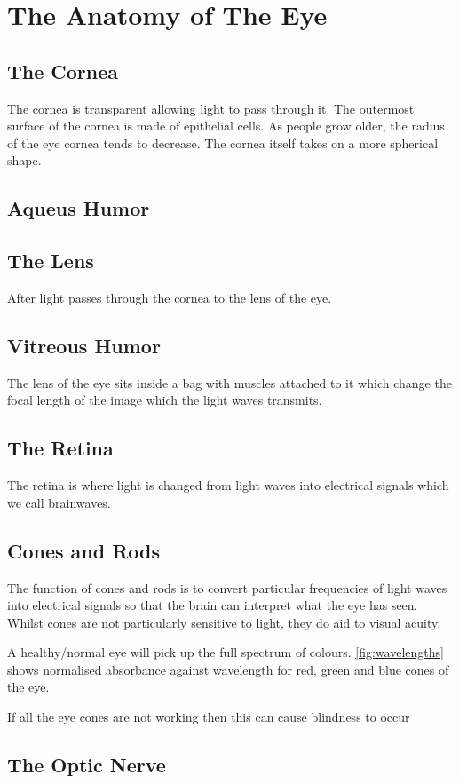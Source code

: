 
 \chapter{The Anatomy of The Eye}

\label{anatomy} %


\section{The Cornea}

The cornea is transparent allowing light to pass through it.
The outermost surface of the cornea is made of epithelial cells.
\cite{hassell2010molecular}
\cite{jester1999cellular,hassell2010molecular} As people grow older, the radius
of the eye cornea tends to decrease. The cornea itself takes on a more
spherical shape.\cite{guirao2000optical}

\section{Aqueus Humor}

\section{The Lens}
After light passes through the cornea to the lens of the eye.

\section{Vitreous Humor}

The lens of the eye sits inside a bag with muscles attached to it which change
the focal length of the image which the light waves transmits.

\section{The Retina}
The retina is where light is changed from light waves into electrical signals
which we call brainwaves.

\section{Cones and Rods}

The function of cones and rods is to convert particular frequencies of light
waves
into electrical signals so that the brain can interpret what the eye has seen.
Whilst cones are not particularly sensitive to light, they do aid to visual
acuity.
\cite{}

A healthy/normal eye will pick up the full spectrum of colours.
\ref{fig:wavelengths} shows normalised absorbance against wavelength for red,
green and blue cones of the eye.

If all the eye cones are not working then this can cause
blindness to occur\cite{}

\section{The Optic Nerve}
